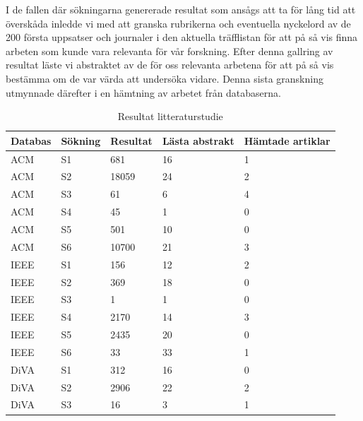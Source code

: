\documentclass[swedish]{maucsthesis}
\begin{document}
I de fallen där sökningarna genererade resultat som ansågs att ta för lång tid att överskåda inledde vi med att granska rubrikerna och eventuella nyckelord av de 200 första uppsatser och journaler i den aktuella träfflistan för att på så vis finna arbeten som kunde vara relevanta för vår forskning. Efter denna gallring av resultat läste vi abstraktet av de för oss relevanta arbetena för att på så vis bestämma om de var värda att undersöka vidare. Denna sista granskning utmynnade därefter i en hämtning av arbetet från databaserna.

\begin{table}[H]
\centering
\caption{Resultat litteraturstudie}
\begin{tabular}{|l|l|l|l|l|}
\hline
Databas & Sökning & Resultat & Lästa abstrakt & Hämtade artiklar \\ \hline
ACM     & S1      & 681      & 16             & 1                \\ \hline
ACM     & S2      & 18059    & 24             & 2                \\ \hline
ACM     & S3      & 61       & 6              & 4                \\ \hline
ACM     & S4      & 45       & 1              & 0                \\ \hline
ACM     & S5      & 501        & 10              & 0                \\ \hline
ACM     & S6      & 10700        & 21              & 3                \\ \hline
IEEE    & S1      & 156      & 12             & 2                \\ \hline
IEEE    & S2      & 369      & 18             & 0                \\ \hline
IEEE    & S3      & 1        & 1              & 0                \\ \hline
IEEE    & S4      & 2170     & 14             & 3                \\ \hline
IEEE    & S5      & 2435     & 20             & 0                \\ \hline
IEEE    & S6      & 33     & 33             & 1                \\ 
\hline
DiVA    & S1      & 312      & 16             & 0                \\ \hline
DiVA    & S2      & 2906     & 22             & 2                \\ \hline
DiVA    & S3      & 16       & 3              & 1                \\ \hline

\end{tabular}
\end{table}
\end{document}
